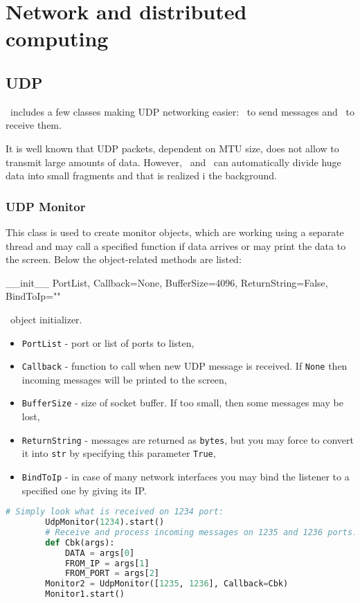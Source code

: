 \chapter{Network and distributed computing}

\section{UDP}

\ShellName\ includes a few classes making UDP networking easier: \UdpSender\ to send messages and \UdpMonitor\ to receive them. 

It is well known that UDP packets, dependent on MTU size, does not allow to transmit large amounts of data. However, \UdpSender\ and \UdpMonitor\ can automatically divide huge data into small fragments and that is realized i the background.

\subsection{UDP Monitor}

This class is used to create monitor objects, which are working using a separate thread and may call a specified function if data arrives or may print the data to the screen. Below the object-related methods are listed:

 {\_\_init\_\_} {PortList, Callback=None, BufferSize=4096, ReturnString=False,\\BindToIp=""} {
	\UdpMonitor\ object initializer.
	\begin{itemize}
		\item \texttt{PortList} - port or list of ports to listen,
		\item \texttt{Callback} - function to call when new UDP message is received. If \texttt{None} then incoming messages will be printed to the screen,
		\item \texttt{BufferSize} - size of socket buffer. If too small, then some messages may be lost,
		\item \texttt{ReturnString} - messages are returned as \texttt{bytes}, but you may force to convert it into \texttt{str} by specifying this parameter \texttt{True},
		\item \texttt{BindToIp} - in case of many network interfaces you may bind the listener to a specified one by giving its IP. 
	\end{itemize}
}
\begin{lstlisting}[language=Python]
		# Simply look what is received on 1234 port:
		UdpMonitor(1234).start()
		# Receive and process incoming messages on 1235 and 1236 ports:
		def Cbk(args):
			DATA = args[0]
			FROM_IP = args[1]
			FROM_PORT = args[2]
		Monitor2 = UdpMonitor([1235, 1236], Callback=Cbk)
		Monitor1.start()
\end{lstlisting}

